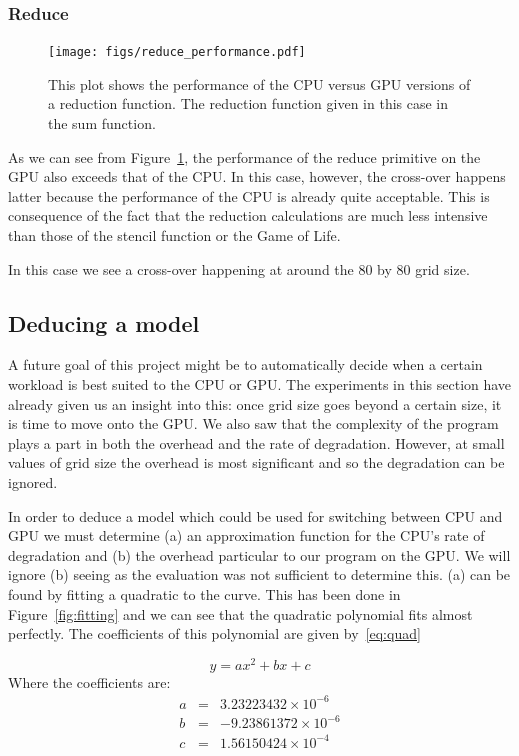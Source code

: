 \documentclass[12pt,a4paper,oneside]{scrbook}
\begin{document}
\subsubsection{Reduce}

\begin{figure}[h]
  \texttt{[image: figs/reduce\_performance.pdf]}
  \caption{This plot shows the performance of the CPU versus GPU versions of a
    reduction function. The reduction function given in this case in the sum
    function.}
  \label{fig:reduceperf}
\end{figure}

As we can see from Figure~\ref{fig:reduceperf}, the performance of the reduce
primitive on the GPU also exceeds that of the CPU. In this case, however, the
cross-over happens latter because the performance of the CPU is already quite
acceptable. This is consequence of the fact that the reduction calculations are
much less intensive than those of the stencil function or the Game of Life.

In this case we see a cross-over happening at around the 80 by 80 grid size.

\subsection{Deducing a model}

A future goal of this project might be to automatically decide when a certain
workload is best suited to the CPU or GPU. The experiments in this section have
already given us an insight into this: once grid size goes beyond a certain
size, it is time to move onto the GPU. We also saw that the complexity of the
program plays a part in both the overhead and the rate of degradation. However,
at small values of grid size the overhead is most significant and so the
degradation can be ignored.

In order to deduce a model which could be used for switching between CPU and GPU
we must determine (a) an approximation function for the CPU's rate of
degradation and (b) the overhead particular to our program on the GPU. We will
ignore (b) seeing as the evaluation was not sufficient to determine this. (a)
can be found by fitting a quadratic to the curve. This has been done in
Figure~\ref{fig:fitting} and we can see that the quadratic polynomial fits
almost perfectly. The coefficients of this polynomial are given by~\ref{eq:quad}

\begin{equation} \label{eq:quad}
y = a x^2 + b x + c
\end{equation}
Where the coefficients are:
\begin{align*}
a & = & 3.23223432 \times 10^{-6}\\
b & = & -9.23861372 \times 10^{-6}\\
c & = & 1.56150424 \times 10^{-4}\\
\end{align*}
\end{document}
